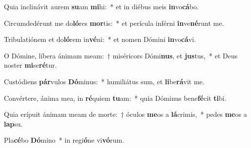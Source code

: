 \item Quia inclinávit aurem \textbf{su}am \textbf{mi}hi:~* et in diébus meis \textbf{in}vo\textbf{cá}bo.
\item Circumdedérunt me do\textbf{ló}res \textbf{mor}tis:~* et perícula inférni \textbf{in}ve\textbf{né}runt me.
\item Tribulatiónem et do\textbf{ló}rem in\textbf{vé}ni:~* et nomen Dómini \textbf{in}vo\textbf{cá}vi.
\item O Dómine, líbera ánimam meam:~† miséricors Dómi\textbf{nus}, et \textbf{jus}tus,~* et Deus noster \textbf{mi}se\textbf{ré}tur.
\item Custódiens \textbf{pár}vulos \textbf{Dó}minus:~* humiliátus sum, et \textbf{li}be\textbf{rá}vit me.
\item Convértere, ánima mea, in \textbf{ré}quiem \textbf{tu}am:~* quia Dóminus bene\textbf{fé}cit \textbf{ti}bi.
\item Quia erípuit ánimam meam de morte:~† óculos \textbf{me}os a \textbf{lá}crimis,~* pedes \textbf{me}os a \textbf{lap}su.
\item Pla\textbf{cé}bo \textbf{Dó}mino~* in regi\textbf{ó}ne vi\textbf{vó}rum.
